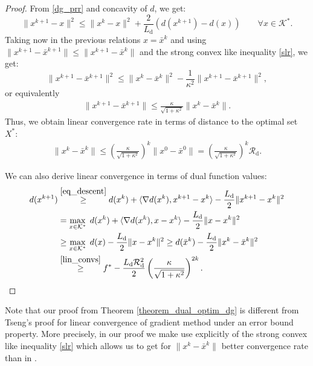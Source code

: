 \documentclass{gOMS2e}
\theoremstyle{plain}
\theoremstyle{definition}
\theoremstyle{remark}
\begin{document}
\begin{proof}
From \eqref{dg_prr} and  concavity of $d$, we get:
\[ \| x^{k+1} - x \|^2 \leq \| x^k - x \|^2 + \frac{2}{L_\text{d}}
 \left( d(x^{k+1}) - d(x) \right)  \qquad  \forall x \in {{\mathcal{K}}^*}. \]  Taking now in the previous relations $x =\bar{x}^{k}$ and using
$\|x^{k+1} - \bar{x}^{k+1}\| \leq \|x^{k+1} - \bar{x}^k\|$ and the strong convex like inequality  \eqref{slr}, we get:
\[  \|x^{k+1} - \bar{x}^{k+1}\|^2 \leq \|x^{k} - \bar{x}^{k}\|^2 - \frac{1}{\kappa^2}  \|x^{k+1} - \bar{x}^{k+1}\|^2, \]
or equivalently
\begin{align}
\label{lin_convw}
\|x^{k+1} - \bar{x}^{k+1}\|  \leq
\frac{\kappa}{\sqrt{1+\kappa^2}} \|x^{k} -
\bar{x}^{k}\|.
\end{align}
\noindent Thus, we obtain  linear convergence rate in terms of distance to the optimal set $X^*$:
\begin{align}
\label{lin_convs} \|x^{k} - \bar{x}^{k}\|  \leq \left( \frac{\kappa}{\sqrt{1+\kappa^2}}\right)^{k} \|x^{0} - \bar{x}^{0}\| = \left( \frac{\kappa}{\sqrt{1+\kappa^2}}\right)^{k} \mathcal{R}_\text{d}.
\end{align}

\noindent We can also derive  linear convergence  in terms of dual
function values:
\begin{align*}
d(x^{k+1}) & \overset{\eqref{eq_descent}}{\geq}  d(x^k) + \langle \nabla d(x^k),
x^{k+1} - x^k\rangle - \frac{L_\text{d}}{2} \|x^{k+1} - x^k\|^2 \\
& =  \max_{x \in {{\mathcal{K}}^*}} \; d(x^k) + \langle \nabla d(x^k), x - x^k\rangle
- \frac{L_\text{d}}{2} \|x - x^k\|^2 \\
& \geq  \max_{x \in {{\mathcal{K}}^*}} \; d(x) - \frac{L_\text{d}}{2} \|x -x^k\|^2
\geq d(\bar{x}^k)  - \frac{L_\text{d}}{2} \|x^k - \bar{x}^k\|^2 \\
& \overset{\eqref{lin_convs}}{\geq} f^* - \frac{L_\text{d}\mathcal{R}_\text{d}^2}{2}
\left( \frac{\kappa}{\sqrt{1+\kappa^2}}\right)^{2k}.
\end{align*}
\end{proof}

\noindent Note that our proof from Theorem
\ref{theorem_dual_optim_dg} is different from Tseng's proof
\cite{Tse:10} for linear convergence of gradient method under an
error bound property. More precisely, in our proof we make use
explicitly of the strong convex like inequality \eqref{slr} which
allows us to get for $\|x^k - \bar x^k\|$ better  convergence rate
than in \cite{Tse:10}.
\end{document}
